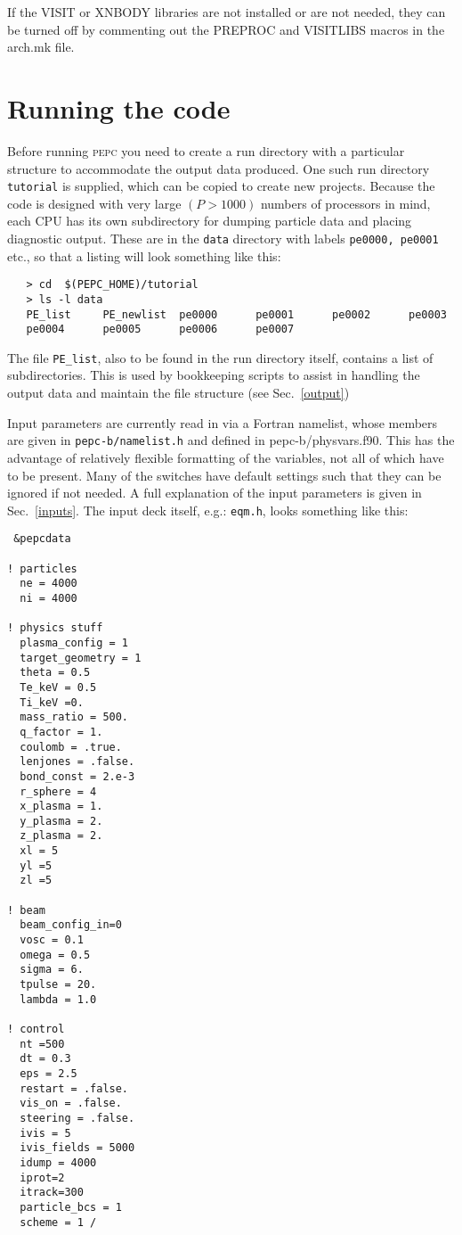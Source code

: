 \documentclass[11pt,psfig]{article}
\begin{document}
\medskip\noindent
If the VISIT or XNBODY libraries are not installed or are not needed, they can
be turned off by commenting out the PREPROC and VISITLIBS macros in the arch.mk file.



\section{Running the code}

Before running \textsc{pepc} you need to create a run directory with a
particular structure to accommodate the output data produced.  One such run
directory {\tt tutorial} is supplied, which can be copied to create new
projects. Because the
code is designed with very large $(P>1000)$ numbers of processors in mind,
each CPU has its own subdirectory for dumping particle data and placing
diagnostic output.  These are in the {\tt data} directory with labels
{\tt pe0000, pe0001} etc., so that a listing will look something like this:
\begin{verbatim}
   > cd  $(PEPC_HOME)/tutorial
   > ls -l data
   PE_list     PE_newlist  pe0000      pe0001      pe0002      pe0003  
   pe0004      pe0005      pe0006      pe0007
\end{verbatim}

\noindent 
The file {\tt PE\_list}, also to be found in the run directory itself, contains
a list of subdirectories.  This is used by bookkeeping scripts to assist in handling the
output data and maintain the file structure (see Sec.~\ref{output})



\medskip\noindent
Input parameters are currently read in via a Fortran namelist, whose members
are given in {\tt pepc-b/namelist.h} and defined in pepc-b/physvars.f90.  This has the advantage of relatively
flexible formatting of the variables, not all of which have to be present.
Many of the switches have default settings such that they can be ignored if
not needed.  A full explanation of the input parameters is given in
Sec.~\ref{inputs}. The input deck itself, e.g.: {\tt eqm.h}, looks something
like this:

\small
\begin{verbatim}
 &pepcdata

! particles
  ne = 4000
  ni = 4000

! physics stuff
  plasma_config = 1  
  target_geometry = 1   
  theta = 0.5
  Te_keV = 0.5 
  Ti_keV =0.
  mass_ratio = 500.
  q_factor = 1.
  coulomb = .true.
  lenjones = .false.
  bond_const = 2.e-3
  r_sphere = 4
  x_plasma = 1.    
  y_plasma = 2.     
  z_plasma = 2.     
  xl = 5  
  yl =5
  zl =5

! beam
  beam_config_in=0  
  vosc = 0.1
  omega = 0.5
  sigma = 6.
  tpulse = 20.
  lambda = 1.0   

! control
  nt =500
  dt = 0.3
  eps = 2.5
  restart = .false.
  vis_on = .false.
  steering = .false.
  ivis = 5
  ivis_fields = 5000
  idump = 4000
  iprot=2
  itrack=300
  particle_bcs = 1
  scheme = 1 /
\end{verbatim}
\end{document}
